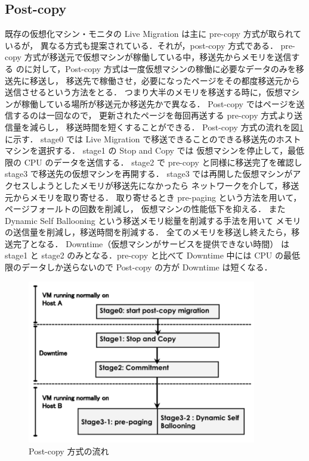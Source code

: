 \documentclass[graduation-thesis]{mlarticle}
\begin{document}
\subsection{Post-copy}
\label{sec-3-1}
既存の仮想化マシン・モニタの Live Migration は主に pre-copy 方式が取られているが，
異なる方式も提案されている．それが，post-copy 方式\cite{Hines:2009:PBL}である．
pre-copy 方式が移送元で仮想マシンが稼働している中，移送先からメモリを送信する
のに対して，Post-copy 方式は一度仮想マシンの稼働に必要なデータのみを移送先に移送し，
移送先で稼働させ，必要になったページをその都度移送元から送信させるという方法をとる．
つまり大半のメモリを移送する時に，仮想マシンが稼働している場所が移送元か移送先かで異なる．
Post-copy ではページを送信するのは一回なので，
更新されたページを毎回再送する pre-copy 方式より送信量を減らし，
移送時間を短くすることができる．
Post-copy 方式の流れを図\ref{post-copy} に示す．
stage0 では Live Migration で移送できることのできる移送先のホストマシンを選択する．
stage1 の Stop and Copy では 仮想マシンを停止して，最低限の CPU のデータを送信する．
stage2 で pre-copy と同様に移送完了を確認し
stage3 で移送先の仮想マシンを再開する．
stage3 では再開した仮想マシンがアクセスしようとしたメモリが移送先になかったら
ネットワークを介して，移送元からメモリを取り寄せる．
取り寄せるとき pre-paging という方法を用いて，ページフォールトの回数を削減し，
仮想マシンの性能低下を抑える．
また Dynamic Self Ballooning という移送メモリ総量を削減する手法を用いて
メモリの送信量を削減し，移送時間を削減する．
全てのメモリを移送し終えたら，移送完了となる．
Downtime（仮想マシンがサービスを提供できない時間）
は stage1 と stage2 のみとなる．pre-copy と比べて
Downtime 中には CPU の最低限のデータしか送らないので Post-copy の方が
Downtime は短くなる．

\begin{figure}[H]\begin{center}\includegraphics[width=10.0cm]{./img/post-copy.png}\caption{ Post-copy 方式の流れ}\label{post-copy}\end{center}\end{figure}
\end{document}
